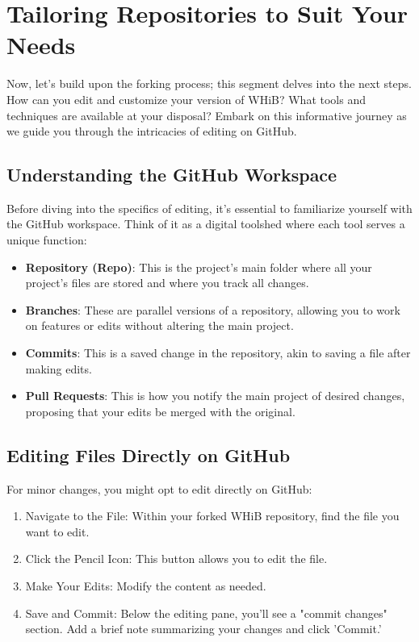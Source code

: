 \documentclass{book}
\begin{document}
\section*{Tailoring Repositories to Suit Your Needs}
Now, let's build upon the forking process; this segment delves into the next steps. How can you edit and customize your version of WHiB? What tools and techniques are available at your disposal? Embark on this informative journey as we guide you through the intricacies of editing on GitHub.

\subsection*{Understanding the GitHub Workspace}
Before diving into the specifics of editing, it's essential to familiarize yourself with the GitHub workspace. Think of it as a digital toolshed where each tool serves a unique function:

\begin{itemize}
    \item \textbf{Repository (Repo)}: This is the project's main folder where all your project's files are stored and where you track all changes.
    \item \textbf{Branches}: These are parallel versions of a repository, allowing you to work on features or edits without altering the main project.
    \item \textbf{Commits}: This is a saved change in the repository, akin to saving a file after making edits.
    \item \textbf{Pull Requests}: This is how you notify the main project of desired changes, proposing that your edits be merged with the original.
\end{itemize}

\subsection*{Editing Files Directly on GitHub}
For minor changes, you might opt to edit directly on GitHub:

\begin{enumerate}
    \item Navigate to the File: Within your forked WHiB repository, find the file you want to edit.
    \item Click the Pencil Icon: This button allows you to edit the file.
    \item Make Your Edits: Modify the content as needed.
    \item Save and Commit: Below the editing pane, you'll see a "commit changes" section. Add a brief note summarizing your changes and click 'Commit.'
\end{enumerate}
\end{document}
